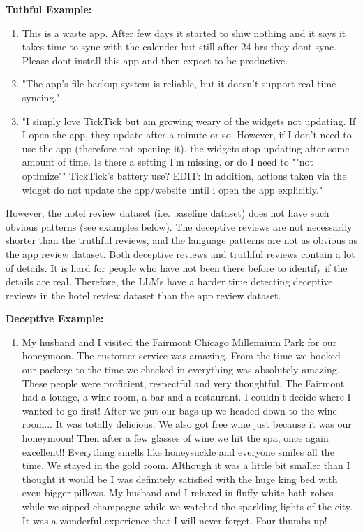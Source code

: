 \documentclass[sigconf, nonacm]{acmart}
\newenvironment{example}
{\begin{mdframed}[
    linecolor=exampleborder,
    linewidth=0.5pt,
    backgroundcolor=examplecolor,
    topline=false,
    bottomline=false,
    leftline=true,
    rightline=false,
    innertopmargin=2pt,
    innerbottommargin=2pt,
    innerleftmargin=5pt,
    innerrightmargin=5pt,
    skipabove=10pt,
    skipbelow=10pt
]}
{\end{mdframed}}
\theoremstyle{definition}
\begin{document}
\begin{example}
  \textbf{Tuthful Example:}
  \begin{enumerate}
    \item This is a waste app. After few days it started to shiw nothing and it says it takes time to sync with the calender but still after 24 hrs they dont sync. Please dont install this app and then expect to be productive.
    \item "The app’s file backup system is reliable, but it doesn’t support real-time syncing."
    \item "I simply love TickTick but am growing weary of the widgets not updating. If I open the app, they update after a minute or so. However, if I don't need to use the app (therefore not opening it), the widgets stop updating after some amount of time. Is there a setting I'm missing, or do I need to ""not optimize"" TickTick's battery use? EDIT: In addition, actions taken via the widget do not update the app/website until i open the app explicitly."
  \end{enumerate}
\end{example}

However, the hotel review dataset (i.e. baseline dataset) does not have such obvious patterns (see examples below). The deceptive reviews are not necessarily shorter than the truthful reviews, and the language patterns are not as obvious as the app review dataset. Both deceptive reviews and truthful reviews contain a lot of details. It is hard for people who have not been there before to identify if the details are real. Therefore, the LLMs have a harder time detecting deceptive reviews in the hotel review dataset than the app review dataset.

\begin{example}
  \textbf{Deceptive Example:}
  \begin{enumerate}
    \item My husband and I visited the Fairmont Chicago Millennium Park for our honeymoon. The customer service was amazing. From the time we booked our packege to the time we checked in everything was absolutely amazing. These people were proficient, respectful and very thoughtful. The Fairmont had a lounge, a wine room, a bar and a restaurant. I couldn't decide where I wanted to go first! After we put our bags up we headed down to the wine room... It was totally delicious. We also got free wine just because it was our honeymoon! Then after a few glasses of wine we hit the spa, once again excellent!! Everything smells like honeysuckle and everyone smiles all the time. We stayed in the gold room. Although it was a little bit smaller than I thought it would be I was definitely satisfied with the huge king bed with even bigger pillows. My husband and I relaxed in fluffy white bath robes while we sipped champagne while we watched the sparkling lights of the city. It was a wonderful experience that I will never forget. Four thumbs up!
  \end{enumerate}
\end{example}
\end{document}
